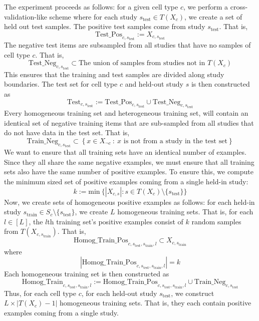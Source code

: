The experiment proceeds as follows: for a given cell type $c$, we perform a cross-validation-like scheme where for each study $s_{\text{test}} \in T(X_c)$, we create a set of held out test samples. The positive test samples come from study $s_{\text{test}}$. That is, 
$$\text{Test\_Pos}_{c,s_{\text{test}}} := X_{c,s_{\text{test}}}$$ 
The negative test items are subsampled from all studies that have no samples of cell type $c$. That is, 
$$\text{Test\_Neg}_{c,s_{\text{test}}} \subset \text{The union of samples from studies not in $T(X_c)$}$$ 
This ensures that the training and test samples are divided along study boundaries.  The test set for cell type $c$ and held-out study $s$ is then constructed as
$$\text{Test}_{c,s_{\text{test}}} := \text{Test\_Pos}_{c,s_{\text{test}}} \cup \text{Test\_Neg}_{c,s_{\text{test}}}$$
Every homogeneous training set and heterogeneous training set, will contain an identical set of negative training items that are sub-sampled from all studies that do not have data in the test set.  That is,
$$\text{Train\_Neg}_{c,s_{\text{test}}} \subset \left\{x \in X_{\neg c} \ : \ \text{$x$ is not from a study in the test set} \right\}$$
We want to ensure that all training sets have an identical number of examples. Since they all share the same negative examples, we must ensure that all training sets also have the same number of positive examples. To ensure this, we compute the minimum sized set of positive examples coming from a single held-in study:
$$k := \text{min} \ \{|X_{c,s}| : s \in T(X_c) \setminus \{s_{\text{test}}\}\}$$
Now, we create sets of homogeneous positive examples as follows: for each held-in study $s_{\text{train}} \in S_c \setminus \{s_{\text{test}}\}$, we create $L$ homogeneous training sets. That is, for each $l \in [L]$, the $l$th training set's positive examples consist of $k$ random samples from $T(X_{c, s_{\text{train}}})$. That is,
$$\text{Homog\_Train\_Pos}_{c,s_{\text{test}},s_{\text{train}},l} \subset X_{c,s_{\text{train}}}$$
where 
$$|\text{Homog\_Train\_Pos}_{c,s_{\text{test}},s_{\text{train}},l}| = k$$
Each homogeneous training set is then constructed as 
$$\text{Homog\_Train}_{c,s_{\text{test}},s_{\text{train}},l} := \text{Homog\_Train\_Pos}_{c,s_{\text{test}},s_{\text{train}},l} \cup \text{Train\_Neg}_{c,s_{\text{test}}}$$
Thus, for each cell type $c$, for each held-out study $s_{\text{test}}$, we construct $L \times |T(X_c) - 1|$ homogeneous training sets. That is, they each contain positive examples coming from a single study.

